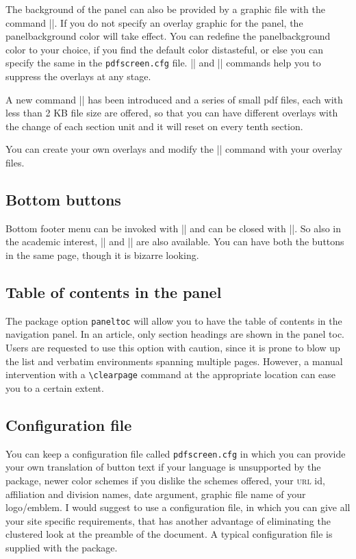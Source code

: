 \documentclass[a4paper]{article}
\begin{document}
The background of the panel can also be provided by a graphic file with
the command |\paneloverlay|. If you do not specify
an overlay graphic for the panel, the panelbackground color will take
effect. You can redefine the panelbackground color to your choice, if
you find the default color distasteful, or else you can specify the
same in the \verb+pdfscreen.cfg+ file.
|\overlayempty| and |\paneloverlayempty| commands help you to
suppress the overlays at any stage.

A new command |\changeoverlay| has been introduced and a series of
small pdf files, each with less than 2 KB file size are offered, so
that you can have different overlays with the change of each section
unit and it will reset on every tenth section.

You can create your own overlays and modify the |\change| command
with your overlay files.

\subsection{Bottom buttons}

Bottom footer menu can be invoked with |\bottombuttons| and can be
closed with |\nobottombuttons|. So also in the academic interest,
|\topbuttons| and |\notopbuttons| are also available. You can
have both the buttons in the same page, though it is bizarre looking.

\subsection{Table of contents in the panel}

The package option \verb+paneltoc+ will allow you to have the table
of contents in the navigation panel. In an article, only section
headings are shown in the panel toc. Users are requested to use this
option with caution, since it is prone to blow up the list and verbatim
environments spanning multiple pages. However, a manual intervention
with a \verb+\clearpage+ command at the appropriate location can
ease you to a certain extent.

\subsection{Configuration file}\label{cfg}

You can keep a configuration file called \verb+pdfscreen.cfg+ in which
you can provide your own translation of button
text if your language is unsupported by the package, newer color
schemes if you dislike the schemes offered, your
\textsc{url} id, affiliation and division names, date
argument, graphic file name of your logo/\allowbreak emblem. I would
suggest to use a configuration file, in which you can give all your
site specific requirements, that has another advantage of eliminating
the clustered look at the preamble of the document. A typical
configuration file is supplied with the package.
\end{document}
